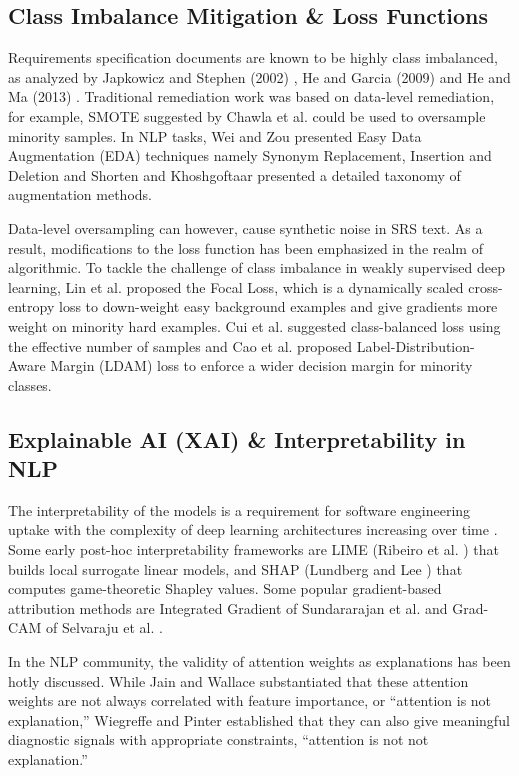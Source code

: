 \documentclass[11pt,a4paper]{article}
\begin{document}
\subsection{Class Imbalance Mitigation \& Loss Functions}
Requirements specification documents are known to be highly class imbalanced, as analyzed by Japkowicz and Stephen (2002) \cite{japkowicz2002class}, He and Garcia (2009) \cite{he2009learning} and He and Ma (2013) \cite{he2013imbalanced}. Traditional remediation work was based on data-level remediation, for example, SMOTE suggested by Chawla et al. \cite{chawla2002smote} could be used to oversample minority samples. In NLP tasks, Wei and Zou \cite{wei2019eda} presented Easy Data Augmentation (EDA) techniques namely Synonym Replacement, Insertion and Deletion and Shorten and Khoshgoftaar \cite{shorten2019survey} presented a detailed taxonomy of augmentation methods.

Data-level oversampling can however, cause synthetic noise in SRS text. As a result, modifications to the loss function has been emphasized in the realm of algorithmic. To tackle the challenge of class imbalance in weakly supervised deep learning, Lin et al. \cite{lin2017focal} proposed the Focal Loss, which is a dynamically scaled cross-entropy loss to down-weight easy background examples and give gradients more weight on minority hard examples. Cui et al. \cite{cui2019class} suggested class-balanced loss using the effective number of samples and Cao et al. \cite{cao2019learning} proposed Label-Distribution-Aware Margin (LDAM) loss to enforce a wider decision margin for minority classes.

\subsection{Explainable AI (XAI) \& Interpretability in NLP}
The interpretability of the models is a requirement for software engineering uptake with the complexity of deep learning architectures increasing over time \cite{danilevsky2020survey, atanasova2020diagnostic}. Some early post-hoc interpretability frameworks are LIME (Ribeiro et al. \cite{ribeiro2016why}) that builds local surrogate linear models, and SHAP (Lundberg and Lee \cite{lundberg2017unified}) that computes game-theoretic Shapley values. Some popular gradient-based attribution methods are Integrated Gradient of Sundararajan et al. \cite{sundararajan2017axiomatic} and Grad-CAM of Selvaraju et al. \cite{selvaraju2017grad}.

In the NLP community, the validity of attention weights as explanations has been hotly discussed. While Jain and Wallace \cite{jain2019attention} substantiated that these attention weights are not always correlated with feature importance, or ``attention is not explanation,'' Wiegreffe and Pinter \cite{wiegreffe2019attention} established that they can also give meaningful diagnostic signals with appropriate constraints, ``attention is not not explanation.''
\end{document}
